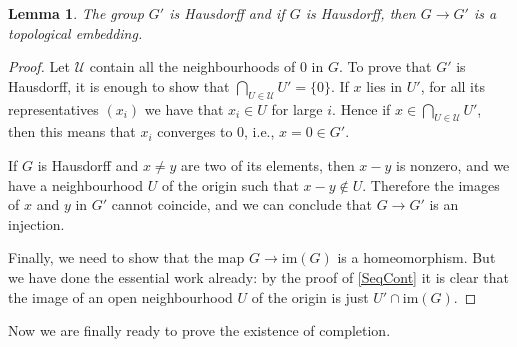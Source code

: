 \documentclass[12pt,a4paper,leqno]{article}
\newcommand{\im}{\mathrm{im}}
\newcommand{\fref}[1]{\hyperref[{#1}]{\ref*{#1}}}
\theoremstyle{plain}
\newtheorem{lem}[theo]{Lemma}
\theoremstyle{definition}
\theoremstyle{remark}
\begin{document}
\begin{lem}
The group $G'$ is Hausdorff and if $G$ is Hausdorff, then $G \to G'$ is a topological embedding.
\end{lem}
\begin{proof}
Let $\mathcal U$ contain all the neighbourhoods of $0$ in $G$. To prove that $G'$ is Hausdorff, it is enough to show that $\bigcap_{U \in \mathcal U} U' = \{ 0 \}$. If $x$ lies in $U'$, for all its representatives $(x_i)$ we have that $x_i \in U$ for large $i$. Hence if $x \in \bigcap_{U \in \mathcal U} U'$, then this means that $x_i$ converges to 0, i.e., $x = 0 \in G'$.

If $G$ is Hausdorff and $x \not = y$ are two of its elements, then $x-y$ is nonzero, and we have a neighbourhood $U$ of the origin such that $x-y \not \in U$. Therefore the images of $x$ and $y$ in $G'$ cannot coincide, and we can conclude that $G \to G'$ is an injection. 

Finally, we need to show that the map $G \to \im (G)$ is a homeomorphism. But we have done the essential work already: by the proof of \fref{SeqCont} it is clear that the image of an open neighbourhood $U$ of the origin is just $U' \cap \im (G)$.
\end{proof}

Now we are finally ready to prove the existence of completion.
\end{document}
